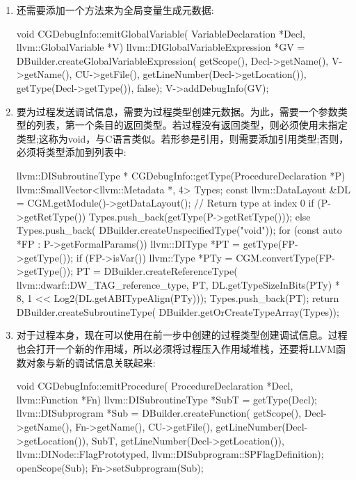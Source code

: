 \begin{enumerate}
\item
还需要添加一个方法来为全局变量生成元数据:

\begin{cpp}
void CGDebugInfo::emitGlobalVariable(
VariableDeclaration *Decl,
llvm::GlobalVariable *V) {
    llvm::DIGlobalVariableExpression *GV =
        DBuilder.createGlobalVariableExpression(
            getScope(), Decl->getName(), V->getName(),
            CU->getFile(),
            getLineNumber(Decl->getLocation()),
            getType(Decl->getType()), false);
    V->addDebugInfo(GV);
}
\end{cpp}

\item
要为过程发送调试信息，需要为过程类型创建元数据。为此，需要一个参数类型的列表，第一个条目的返回类型。若过程没有返回类型，则必须使用未指定类型;这称为void，与C语言类似。若形参是引用，则需要添加引用类型;否则，必须将类型添加到列表中:

\begin{cpp}
llvm::DISubroutineType *
CGDebugInfo::getType(ProcedureDeclaration *P) {
    llvm::SmallVector<llvm::Metadata *, 4> Types;
    const llvm::DataLayout &DL =
        CGM.getModule()->getDataLayout();
    // Return type at index 0
    if (P->getRetType())
        Types.push_back(getType(P->getRetType()));
    else
        Types.push_back(
            DBuilder.createUnspecifiedType("void"));
    for (const auto *FP : P->getFormalParams()) {
        llvm::DIType *PT = getType(FP->getType());
        if (FP->isVar()) {
            llvm::Type *PTy = CGM.convertType(FP->getType());
            PT = DBuilder.createReferenceType(
                llvm::dwarf::DW_TAG_reference_type, PT,
                DL.getTypeSizeInBits(PTy) * 8,
                1 << Log2(DL.getABITypeAlign(PTy)));
        }
        Types.push_back(PT);
    }
    return DBuilder.createSubroutineType(
        DBuilder.getOrCreateTypeArray(Types));
}
\end{cpp}

\item
对于过程本身，现在可以使用在前一步中创建的过程类型创建调试信息。过程也会打开一个新的作用域，所以必须将过程压入作用域堆栈，还要将LLVM函数对象与新的调试信息关联起来:

\begin{cpp}
void CGDebugInfo::emitProcedure(
        ProcedureDeclaration *Decl, llvm::Function *Fn) {
    llvm::DISubroutineType *SubT = getType(Decl);
    llvm::DISubprogram *Sub = DBuilder.createFunction(
        getScope(), Decl->getName(), Fn->getName(),
        CU->getFile(), getLineNumber(Decl->getLocation()),
        SubT, getLineNumber(Decl->getLocation()),
        llvm::DINode::FlagPrototyped,
        llvm::DISubprogram::SPFlagDefinition);
    openScope(Sub);
    Fn->setSubprogram(Sub);
}
\end{cpp}


\end{enumerate}
